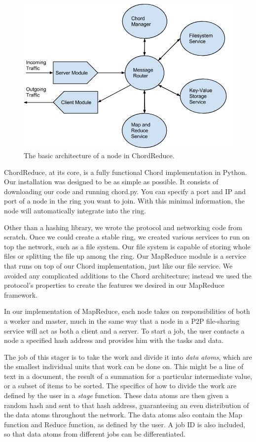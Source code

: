 \documentclass[10pt, conference, compsocconf]{IEEEtran}
\begin{document}
\begin{figure}
    \includegraphics[width=\linewidth]{crArch}
    \caption{The basic architecture of a node in ChordReduce.}
    \label{crArch}
\end{figure}


ChordReduce, at its core, is a fully functional Chord implementation in Python.  Our installation was designed to be as simple as possible.  It consists of downloading our code \cite{code} and running chord.py.  You can specify a port and IP and port of a node in the ring you want to join.  With this minimal information, the node will automatically integrate into the ring.

Other than a hashing library, we wrote the protocol and networking code from scratch.  Once we could create a stable ring, we created various services to run on top the network, such as a file system.  Our file system is capable of storing whole files or splitting the file up among the ring. Our MapReduce module is a service that runs on top of our Chord implementation, just like our file service.    We avoided any complicated additions to the Chord architecture; instead we used the protocol's properties to create the features we desired in our MapReduce framework. 
  
In our implementation of MapReduce, each node takes on responsibilities of both a worker and master, much in the same way that a node in a P2P file-sharing service will act as both a client and a server.  To start a job, the user contacts a node a specified hash address and provides him with the tasks and data. 

The job of this stager is to take the work and divide it into \emph{data atoms}, which are the smallest individual units that work can be done on.  This might be a line of text in a document, the result of a summation for a particular intermediate value, or a subset of items to be sorted.  The specifics of how to divide the work are defined by the user in a \emph{stage} function.  These data atoms are then given a random hash and sent to that hash address, guaranteeing an even distribution of the data atoms throughout the network.  The data atoms also contain the Map function and Reduce function, as defined by the user.  A job ID is also included, so that data atoms from different jobs can be differentiated.
\end{document}
